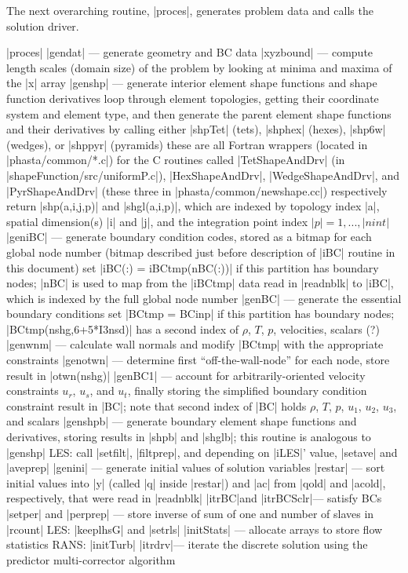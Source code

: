 \documentclass[11pt]{article}
\begin{document}
The next overarching routine, |proces|, generates problem data and calls the solution driver.
\begin{outline}[deep]
\1 |proces|
	\2 |gendat| --- generate geometry and BC data
		\3 |xyzbound| --- compute length scales (domain size) of the problem by looking at minima and maxima of the |x| array
		\3 |genshp| --- generate interior element shape functions and shape function derivatives
			\4 loop through element topologies, getting their coordinate system and element type, and then generate the parent element shape functions and their derivatives by calling either |shpTet| (tets), |shphex| (hexes), |shp6w| (wedges), or |shppyr| (pyramids)
			\4 these are all Fortran wrappers (located in |phasta/common/*.c|) for the C routines called |TetShapeAndDrv| (in |shapeFunction/src/uniformP.c|), |HexShapeAndDrv|, |WedgeShapeAndDrv|, and |PyrShapeAndDrv| (these three in |phasta/common/newshape.cc|) respectively
			\4 return |shp(a,i,j,p)| and |shgl(a,i,p)|, which are indexed by topology index |a|, spatial dimension(s) |i| and |j|, and the integration point index $|p| = 1, ..., |nint|$
		\3 |geniBC| --- generate boundary condition codes, stored as a bitmap for each global node number (bitmap described just before description of |iBC| routine in this document)
			\4 set |iBC(:) = iBCtmp(nBC(:))| if this partition has boundary nodes; |nBC| is used to map from the |iBCtmp| data read in |readnblk| to |iBC|, which is indexed by the full global node number
		\3 |genBC| --- generate the essential boundary conditions
			\4 set |BCtmp = BCinp| if this partition has boundary nodes; |BCtmp(nshg,6+5*I3nsd)| has a second index of $\rho$, $T$, $p$, velocities, scalars (?)
			\4 |genwnm| --- calculate wall normals and modify |BCtmp| with the appropriate constraints
			\4 |genotwn| --- determine first ``off-the-wall-node'' for each node, store result in |otwn(nshg)|
			\4 |genBC1| --- account for arbitrarily-oriented velocity constraints $u_r$, $u_s$, and $u_t$, finally storing the simplified boundary condition constraint result in |BC|; note that second index of |BC| holds $\rho$, $T$, $p$, $u_1$, $u_2$, $u_3$, and scalars
		\3 |genshpb| --- generate boundary element shape functions and derivatives, storing results in |shpb| and |shglb|; this routine is analogous to |genshp|
		\3 LES: call |setfilt|, |filtprep|, and depending on |iLES|' value, |setave| and |aveprep|
		\3 |genini| --- generate initial values of solution variables
			\4 |restar| --- sort initial values into |y| (called |q| inside |restar|) and |ac| from |qold| and |acold|, respectively, that were read in |readnblk|
			\4 |itrBC|\ra and |itrBCSclr|\ra --- satisfy BCs
	\2 |setper| and |perprep| --- store inverse of sum of one and number of slaves in |rcount|
	\2 LES: |keeplhsG| and |setrls|
	\2 |initStats| --- allocate arrays to store flow statistics
	\2 RANS: |initTurb|
	\2 |itrdrv|\ra --- iterate the discrete solution using the predictor multi-corrector algorithm
\end{outline}
\end{document}
